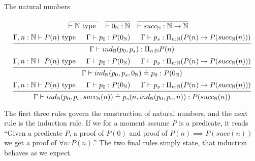 \documentclass[a4paper, 12pt]{article}
\newcommand{\N}{\mathbb{N}}
\theoremstyle{changedot}
\theoremstyle{changedotbreak}
\theoremstyle{nonumberplain}
\begin{document}
\begin{definition}
  The natural numbers

\begin{align*}
 &\begin{prooftree}
    \infer0{\vdash \N \text{ type }}
  \end{prooftree}
   &
  &\begin{prooftree}
    \infer0{\vdash 0_{\N} : \N}
    \end{prooftree}
    &
    &\begin{prooftree}
      \infer0{\vdash succ_{\N} : \N \to \N}
    \end{prooftree}
\end{align*}
\begin{align*}
  \begin{prooftree}
    \hypo{\Gamma, n : \N \vdash P(n) \text{ type}}
    \hypo{\Gamma \vdash p_{0} : P(0_{\N})}
    \hypo{\Gamma \vdash p_{s} : \Pi_{n:\N} (P(n) \to P(succ_{\N}(n)))}
    \infer3{\Gamma \vdash ind_{\N}(p_{0}, p_{s}) : \Pi_{n:\N} P(n)}
  \end{prooftree}
\end{align*}
\begin{align*}
  \begin{prooftree}
      \hypo{\Gamma, n : \N \vdash P(n) \text{ type}}
      \hypo{\Gamma \vdash p_{0} : P(0_{\N})}
      \hypo{\Gamma \vdash p_{s} : \Pi_{n:\N} (P(n) \to P(succ_{\N}(n)))}
      \infer3{\Gamma \vdash ind_{\N}(p_{0}, p_{s}, 0_{\N}) \doteq p_{0} : P(0_{\N})}
  \end{prooftree}
\end{align*}
\begin{align*}
  \begin{prooftree}
      \hypo{\Gamma, n : \N \vdash P(n) \text{ type}}
      \hypo{\Gamma \vdash p_{0} : P(0_{\N})}
      \hypo{\Gamma \vdash p_{s} : \Pi_{n:\N} (P(n) \to P(succ_{\N}(n)))}
      \infer3{\Gamma \vdash ind_{\N}(p_{0}, p_{s}, succ_{\N}(n)) \doteq p_{s}(n, ind_{\N}(p_{0}, p_{s}, n)) : P(succ_{\N}(n))}
  \end{prooftree}
\end{align*}
\end{definition}

The first three rules govern the construction of natural numbers, and the next rule is the induction rule. If we for a moment assume $P$ is a predicate, it reads ``Given a predicate $P$, a proof of $P(0)$ and proof of $P(n) \implies P(succ(n))$ we get a proof of $\forall n: P(n)$.'' The two final rules simply state, that induction behaves as we expect.
\end{document}

